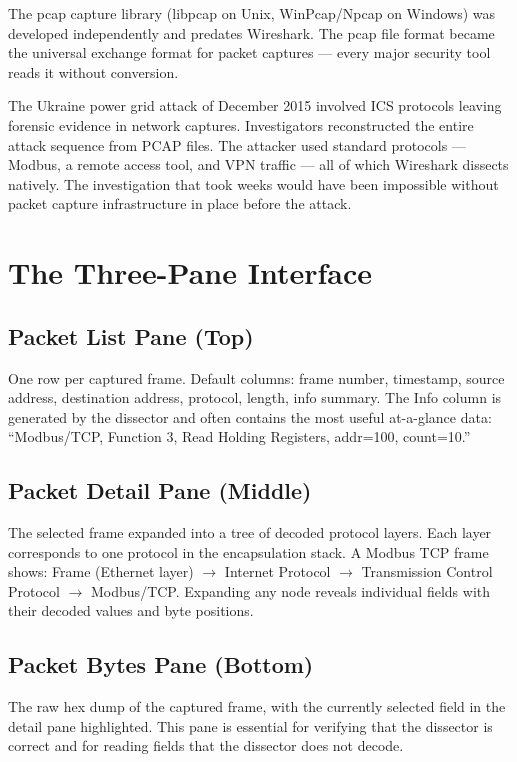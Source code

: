 \documentclass[12pt,twoside,openright]{memoir}
\begin{document}
The pcap capture library (libpcap on Unix, WinPcap/Npcap on Windows) was developed independently and predates Wireshark. The pcap file format became the universal exchange format for packet captures --- every major security tool reads it without conversion.

\begin{fieldnote}
The Ukraine power grid attack of December 2015 involved ICS protocols leaving forensic evidence in network captures. Investigators reconstructed the entire attack sequence from PCAP files. The attacker used standard protocols --- Modbus, a remote access tool, and VPN traffic --- all of which Wireshark dissects natively. The investigation that took weeks would have been impossible without packet capture infrastructure in place before the attack.
\end{fieldnote}

\section{The Three-Pane Interface}

\subsection{Packet List Pane (Top)}
One row per captured frame. Default columns: frame number, timestamp, source address, destination address, protocol, length, info summary. The Info column is generated by the dissector and often contains the most useful at-a-glance data: ``Modbus/TCP, Function 3, Read Holding Registers, addr=100, count=10.''

\subsection{Packet Detail Pane (Middle)}
The selected frame expanded into a tree of decoded protocol layers. Each layer corresponds to one protocol in the encapsulation stack. A Modbus TCP frame shows: Frame (Ethernet layer) $\to$ Internet Protocol $\to$ Transmission Control Protocol $\to$ Modbus/TCP. Expanding any node reveals individual fields with their decoded values and byte positions.

\subsection{Packet Bytes Pane (Bottom)}
The raw hex dump of the captured frame, with the currently selected field in the detail pane highlighted. This pane is essential for verifying that the dissector is correct and for reading fields that the dissector does not decode.
\end{document}
